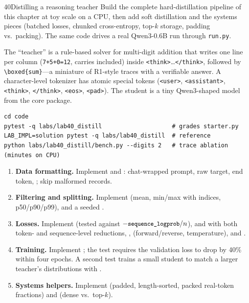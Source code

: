 \begin{labbox}{40}{Distilling a reasoning teacher}
Build the complete hard-distillation pipeline of this chapter at toy scale on a CPU, then add
soft distillation and the systems pieces (batched losses, chunked cross-entropy, top-$k$ storage,
padding vs.\ packing). The same code drives a real Qwen3-0.6B run through \texttt{run.py}.

The ``teacher'' is a rule-based solver for multi-digit addition that writes one line per column
(\texttt{7+5+0=12}, carries included) inside \texttt{<think>}\ldots\texttt{</think>}, followed by
\texttt{\textbackslash boxed\{sum\}}---a miniature of R1-style traces with a verifiable answer. A character-level
tokenizer has atomic special tokens (\texttt{<user>}, \texttt{<assistant>}, \texttt{<think>},
\texttt{</think>}, \texttt{<eos>}, \texttt{<pad>}). The student is a tiny Qwen3-shaped model from
the core package.
\begin{lstlisting}[style=shell]
cd code
pytest -q labs/lab40_distill                    # grades starter.py
LAB_IMPL=solution pytest -q labs/lab40_distill  # reference
python labs/lab40_distill/bench.py --digits 2   # trace ablation (minutes on CPU)
\end{lstlisting}

\begin{enumerate}
\item \textbf{Data formatting.} Implement  and
: chat-wrapped prompt, raw target, end token, ;
skip malformed records.
\item \textbf{Filtering and splitting.} Implement  (mean, min/max with
indices, p50/p90/p99),  and a seeded .
\item \textbf{Losses.} Implement  (tested against
$-\ident{sequence_logprob}/n$),  and 
with both token- and sequence-level reductions, ,
 (forward/reverse, temperature),  and .
\item \textbf{Training.} Implement ; the test requires the validation
loss to drop by 40\% within four epochs. A second test trains a small student to match a larger
teacher's distributions with .
\item \textbf{Systems helpers.} Implement  (padded, length-sorted, packed
real-token fractions) and  (dense vs.\ top-$k$).
\end{enumerate}


\end{labbox}
